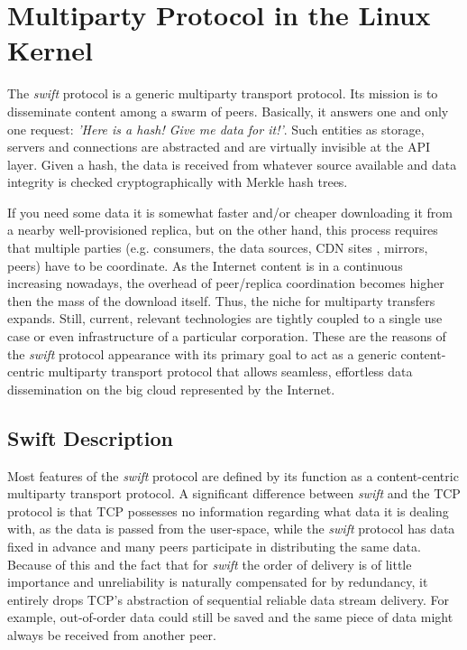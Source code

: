 
\chapter{Multiparty Protocol in the Linux Kernel}
\label{chapter:multiparty}

The \textit{swift} protocol is a generic multiparty transport protocol. Its
mission is to disseminate content among a swarm of peers. Basically, it
answers one and only one request: \textit{'Here is a hash! Give me data for
it!'}. Such entities as storage, servers and connections are abstracted and
are virtually invisible at the API layer. Given a hash, the data is received
from whatever source available and data integrity is checked cryptographically
with Merkle hash trees.

If you need some data it is somewhat faster and/or cheaper downloading it from
a nearby well-provisioned replica, but on the other hand, this process
requires that multiple parties (e.g. consumers, the data sources, CDN
sites\cite{cdnwiki} , mirrors, peers) have to be coordinate. As the Internet
content  is in a continuous increasing nowadays, the overhead of peer/replica
coordination becomes higher then the mass of the download itself. Thus, the
niche for multiparty transfers expands. Still, current, relevant technologies
are tightly coupled to a single use case or even infrastructure of a
particular corporation. These are the reasons of the \textit{swift} protocol
appearance with its primary goal to act as a generic content-centric
multiparty transport protocol that allows seamless, effortless data
dissemination on the big cloud represented by the Internet.

\section{Swift Description}
\label{sec:multiparty:description}

Most features of the \textit{swift} protocol are defined by its function as a
content-centric multiparty transport protocol. A significant difference
between \textit{swift} and the TCP protocol is that TCP possesses no
information regarding what data it is dealing with, as the data is passed from
the user-space, while the \textit{swift} protocol has data fixed in advance
and many peers participate in distributing the same data. Because of this and
the fact that for \textit{swift} the order of delivery is of little importance
and unreliability is naturally compensated for by redundancy, it entirely
drops TCP's abstraction of sequential reliable data stream delivery. For
example, out-of-order data could still be saved and the same piece of data
might always be received from another peer.

